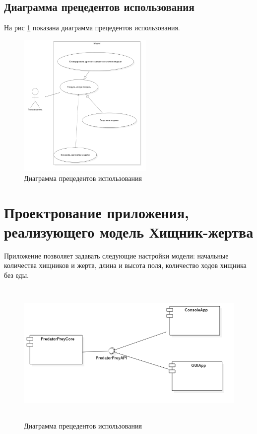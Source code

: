 \documentclass[a4paper]{article}
\begin{document}
\subsection{Диаграмма прецедентов использования}
На рис \ref{pic:UseCaseDiagram1} показана диаграмма прецедентов использования.
\begin{figure}[H]
	\begin{center}
		\includegraphics[scale=0.4, height=7cm]{pictures/UseCaseDiagram}
		\caption{Диаграмма прецедентов использования} 
		\label{pic:UseCaseDiagram1} %
	\end{center}
\end{figure}

\section{Проектрование приложения, реализующего модель Хищник-жертва}
Приложение позволяет задавать следующие настройки модели: начальные количества хищников и жертв, длина и высота поля, количество ходов хищника без еды. 

\begin{figure}[H]
	\begin{center}
		\includegraphics[scale=0.4, height=7cm]{pictures/ComponentDiagram1}
		\caption{Диаграмма прецедентов использования} 
		\label{pic:ComponentDiagram} %
	\end{center}
\end{figure}
\end{document}
